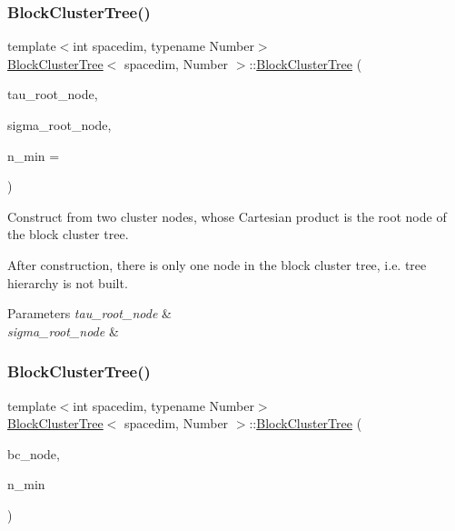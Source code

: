 \subsubsection{\texorpdfstring{Block\+Cluster\+Tree()}{BlockClusterTree()}\hspace{0.1cm}{\footnotesize\ttfamily [3/8]}}
{\footnotesize\ttfamily template$<$int spacedim, typename Number$>$ \\
\hyperlink{classBlockClusterTree}{Block\+Cluster\+Tree}$<$ spacedim, Number $>$\+::\hyperlink{classBlockClusterTree}{Block\+Cluster\+Tree} (\begin{DoxyParamCaption}\item[{typename \hyperlink{classClusterTree}{Cluster\+Tree}$<$ spacedim, Number $>$\+::\hyperlink{classTreeNode}{node\+\_\+pointer\+\_\+type}}]{tau\+\_\+root\+\_\+node,  }\item[{typename \hyperlink{classClusterTree}{Cluster\+Tree}$<$ spacedim, Number $>$\+::\hyperlink{classTreeNode}{node\+\_\+pointer\+\_\+type}}]{sigma\+\_\+root\+\_\+node,  }\item[{const unsigned int}]{n\+\_\+min = {} }\end{DoxyParamCaption})}

Construct from two cluster nodes, whose Cartesian product is the root node of the block cluster tree.

After construction, there is only one node in the block cluster tree, i.\+e. tree hierarchy is not built.


\begin{DoxyParams}{Parameters}
{\em tau\+\_\+root\+\_\+node} & \\
\hline
{\em sigma\+\_\+root\+\_\+node} & \\
\hline
\end{DoxyParams}
\mbox{\label{classBlockClusterTree_ace6087e8fe7dc3d737ff6b4cd97070fc}} 
\subsubsection{\texorpdfstring{Block\+Cluster\+Tree()}{BlockClusterTree()}\hspace{0.1cm}{\footnotesize\ttfamily [4/8]}}
{\footnotesize\ttfamily template$<$int spacedim, typename Number$>$ \\
\hyperlink{classBlockClusterTree}{Block\+Cluster\+Tree}$<$ spacedim, Number $>$\+::\hyperlink{classBlockClusterTree}{Block\+Cluster\+Tree} (\begin{DoxyParamCaption}\item[{\hyperlink{classTreeNode}{node\+\_\+pointer\+\_\+type}}]{bc\+\_\+node,  }\item[{const unsigned int}]{n\+\_\+min }\end{DoxyParamCaption})}

